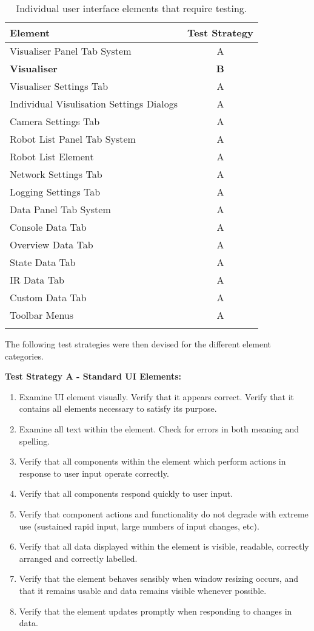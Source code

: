 \begin{longtable}{ l c }
\caption[User Interface Elements]{Individual user interface elements that require testing.}\\
 Element & Test Strategy\\
 \hline
 Visualiser Panel Tab System & A \\
 \textbf{Visualiser} & \textbf{B} \\
 Visualiser Settings Tab & A \\
 Individual Visulisation Settings Dialogs & A \\
 Camera Settings Tab & A \\
 Robot List Panel Tab System & A \\
 Robot List Element & A \\
 Network Settings Tab & A \\
 Logging Settings Tab & A \\
 Data Panel Tab System & A \\
 Console Data Tab & A \\
 Overview Data Tab & A \\
 State Data Tab & A \\
 IR Data Tab & A \\
 Custom Data Tab & A \\
 Toolbar Menus & A \\
 \bottomrule
 \label{tab:UserInterfaceElements}
\end{longtable}

The following test strategies were then devised for the different element categories.

\textbf{Test Strategy A - Standard UI Elements:}

\begin{enumerate}
 \item Examine UI element visually. Verify that it appears correct. Verify that it contains all elements necessary to satisfy its purpose.
 \item Examine all text within the element. Check for errors in both meaning and spelling.
 \item Verify that all components within the element which perform actions in response to user input operate correctly.
 \item Verify that all components respond quickly to user input.
 \item Verify that component actions and functionality do not degrade with extreme use (sustained rapid input, large numbers of input changes, etc).
 \item Verify that all data displayed within the element is visible, readable, correctly arranged and correctly labelled.
 \item Verify that the element behaves sensibly when window resizing occurs, and that it remains usable and data remains visible whenever possible.
 \item Verify that the element updates promptly when responding to changes in data.
\end{enumerate}

